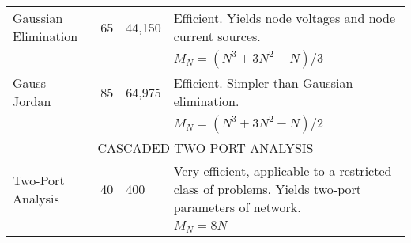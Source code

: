 \begin{table}
\begin{tabular}{|lllp{3in}|}
  \hline
Gaussian Elimination & 65   & 44,150&
  Efficient. Yields node voltages and node current sources.\\
  &&& $M_N = (N^3+3N^2-N)/3$\\
  \hline
Gauss-Jordan        &  85   & 64,975&
  Efficient. Simpler than Gaussian elimination.\\
  &&& $M_N = (N^3+3N^2-N)/2$\\
\hline
\hline
\multicolumn{4}{|c|}{CASCADED TWO-PORT ANALYSIS}\\
\hline
Two-Port Analysis   &  40  & 400 &
  Very efficient, applicable to a restricted class of problems. Yields two-port
  parameters of network. \\
  &&& $M_N = 8N$\\
\hline
\hline
\end{tabular}
\end{table}
